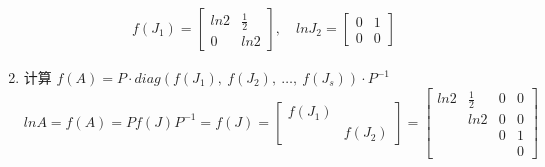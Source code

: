 \begin{solution}
\begin{enumerate}
\begin{align*}
                                f(J_1) = \begin{bmatrix}
                                    ln2 & \frac{1}{2} \\ 0 & ln2
                                \end{bmatrix}, \quad lnJ_2 = \begin{bmatrix}
                                    0 & 1 \\ 0 & 0
                                \end{bmatrix}
                            \end{align*}
                        \item 计算 $f(A) = P \cdot diag(f(J_1), \ f(J_2), \ \dots, \ f(J_s)) \cdot P^{-1}$
                            \begin{equation*}
                                lnA = f(A) = Pf(J)P^{-1} = f(J) = \begin{bmatrix}
                                    f(J_1) & \\ & f(J_2) 
                                \end{bmatrix} = \begin{bmatrix}
                                    ln2 & \frac{1}{2} & 0 & 0 \\ & ln2 & 0 & 0 \\ & & 0 & 1 \\ & & & 0
                                \end{bmatrix}
                            \end{equation*}   
                        \end{enumerate}
            \end{solution}